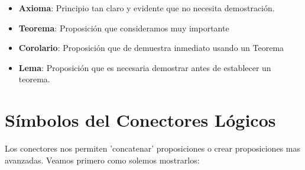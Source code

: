 \documentclass[12pt, fleqn]{report}                             %
\theoremstyle{break}                                            %
\begin{document}
                \begin{itemize}
                    \item \textbf{Axioma}:
                        Principio tan claro y evidente que no necesita demostración.

                    \item \textbf{Teorema}:
                        Proposición que consideramos muy importante

                    \item \textbf{Corolario}:
                        Proposición que de demuestra inmediato usando un Teorema

                    \item \textbf{Lema}:
                        Proposición que es necesaria demostrar antes de establecer un teorema.

                \end{itemize}




        \clearpage
        \section{Símbolos del Conectores Lógicos}

            Los conectores nos permiten 'concatenar' proposiciones o crear proposiciones mas avanzadas. 
            Veamos primero como solemos mostrarlos:
\end{document}
